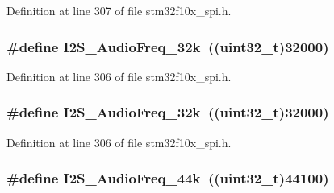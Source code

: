 Definition at line 307 of file stm32f10x\+\_\+spi.\+h.

\subsubsection[{\texorpdfstring{I2\+S\+\_\+\+Audio\+Freq\+\_\+32k}{I2S_AudioFreq_32k}}]{\setlength{\rightskip}{0pt plus 5cm}\#define I2\+S\+\_\+\+Audio\+Freq\+\_\+32k~(({\bf uint32\+\_\+t})32000)}\hypertarget{group___i2_s___audio___frequency_gac501b566718f4890aaafa323a33b732c}{}\label{group___i2_s___audio___frequency_gac501b566718f4890aaafa323a33b732c}


Definition at line 306 of file stm32f10x\+\_\+spi.\+h.

\subsubsection[{\texorpdfstring{I2\+S\+\_\+\+Audio\+Freq\+\_\+32k}{I2S_AudioFreq_32k}}]{\setlength{\rightskip}{0pt plus 5cm}\#define I2\+S\+\_\+\+Audio\+Freq\+\_\+32k~(({\bf uint32\+\_\+t})32000)}\hypertarget{group___i2_s___audio___frequency_gac501b566718f4890aaafa323a33b732c}{}\label{group___i2_s___audio___frequency_gac501b566718f4890aaafa323a33b732c}


Definition at line 306 of file stm32f10x\+\_\+spi.\+h.

\subsubsection[{\texorpdfstring{I2\+S\+\_\+\+Audio\+Freq\+\_\+44k}{I2S_AudioFreq_44k}}]{\setlength{\rightskip}{0pt plus 5cm}\#define I2\+S\+\_\+\+Audio\+Freq\+\_\+44k~(({\bf uint32\+\_\+t})44100)}\hypertarget{group___i2_s___audio___frequency_ga3514e4c292b92b8a7d8a6916f4e3690c}{}\label{group___i2_s___audio___frequency_ga3514e4c292b92b8a7d8a6916f4e3690c}


